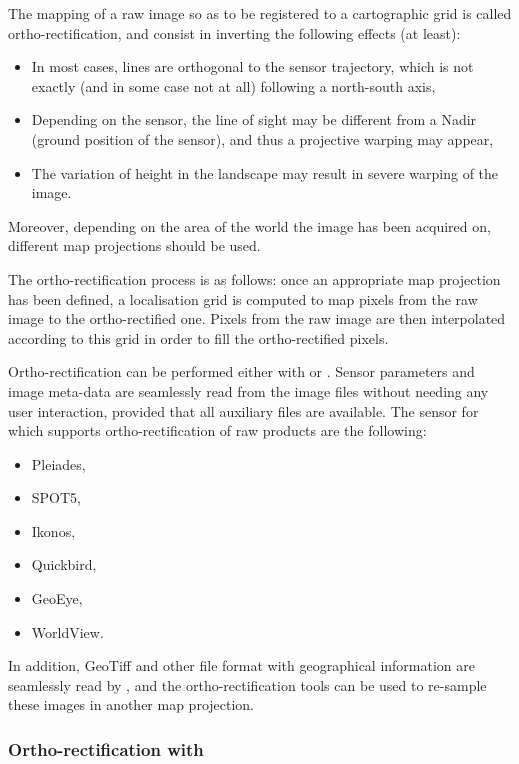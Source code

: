 The mapping of a raw image so as to be registered to a cartographic
grid is called ortho-rectification, and consist in inverting the
following effects (at least):
\begin{itemize}
\item In most cases, lines are orthogonal to the sensor trajectory,
 which is not exactly (and in some case not at all) following a
 north-south axis,
\item Depending on the sensor, the line of sight may be different from
  a Nadir (ground position of the sensor), and thus a projective
  warping may appear,
\item The variation of height in the landscape may result in severe
  warping of the image.
\end{itemize}

Moreover, depending on the area of the world the image has been
acquired on, different map projections should be used.

The ortho-rectification process is as follows: once an appropriate map
projection has been defined, a localisation grid is computed to map
pixels from the raw image to the ortho-rectified one. Pixels from the
raw image are then interpolated according to this grid in order to
fill the ortho-rectified pixels.

Ortho-rectification can be performed either with \app or \mont. Sensor
parameters and image meta-data are seamlessly read from the image
files without needing any user interaction, provided that all
auxiliary files are available. The sensor for which \otb
supports ortho-rectification of raw products are the following:
\begin{itemize}
\item Pleiades,
\item SPOT5,
\item Ikonos,
\item Quickbird,
\item GeoEye,
\item WorldView.
\end{itemize}

In addition, GeoTiff and other file format with geographical
information are seamlessly read by \otb, and the ortho-rectification
tools can be used to re-sample these images in another map projection.

\subsubsection{Ortho-rectification with \app}

